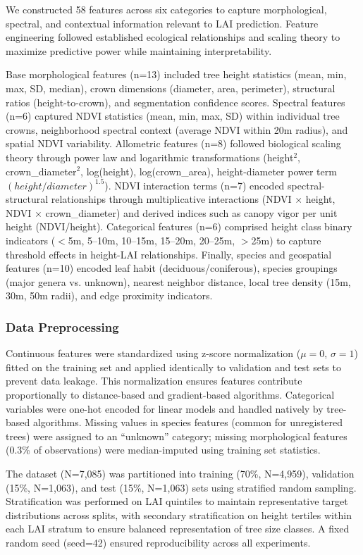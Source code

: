 We constructed 58 features across six categories to capture morphological, spectral, and contextual information relevant to LAI prediction. Feature engineering followed established ecological relationships and scaling theory to maximize predictive power while maintaining interpretability.

Base morphological features (n=13) included tree height statistics (mean, min, max, SD, median), crown dimensions (diameter, area, perimeter), structural ratios (height-to-crown), and segmentation confidence scores. Spectral features (n=6) captured NDVI statistics (mean, min, max, SD) within individual tree crowns, neighborhood spectral context (average NDVI within 20m radius), and spatial NDVI variability. Allometric features (n=8) followed biological scaling theory through power law and logarithmic transformations (height$^2$, crown\_diameter$^2$, log(height), log(crown\_area), height-diameter power term $(height/diameter)^{1.5}$). NDVI interaction terms (n=7) encoded spectral-structural relationships through multiplicative interactions (NDVI $\times$ height, NDVI $\times$ crown\_diameter) and derived indices such as canopy vigor per unit height (NDVI/height). Categorical features (n=6) comprised height class binary indicators ($<$5m, 5--10m, 10--15m, 15--20m, 20--25m, $>$25m) to capture threshold effects in height-LAI relationships. Finally, species and geospatial features (n=10) encoded leaf habit (deciduous/coniferous), species groupings (major genera vs. unknown), nearest neighbor distance, local tree density (15m, 30m, 50m radii), and edge proximity indicators.

\subsubsection{Data Preprocessing}

Continuous features were standardized using z-score normalization ($\mu=0$, $\sigma=1$) fitted on the training set and applied identically to validation and test sets to prevent data leakage. This normalization ensures features contribute proportionally to distance-based and gradient-based algorithms. Categorical variables were one-hot encoded for linear models and handled natively by tree-based algorithms. Missing values in species features (common for unregistered trees) were assigned to an ``unknown'' category; missing morphological features (0.3\% of observations) were median-imputed using training set statistics.

The dataset (N=7,085) was partitioned into training (70\%, N=4,959), validation (15\%, N=1,063), and test (15\%, N=1,063) sets using stratified random sampling. Stratification was performed on LAI quintiles to maintain representative target distributions across splits, with secondary stratification on height tertiles within each LAI stratum to ensure balanced representation of tree size classes. A fixed random seed (seed=42) ensured reproducibility across all experiments.

